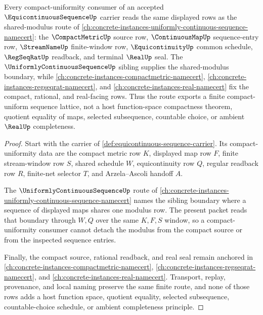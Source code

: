 \begin{theorem}
\label{thm:equicontinuous-sequence-uniform-lattice-route}
Every compact-uniformity consumer of an accepted $\EquicontinuousSequenceUp$ carrier reads the same displayed rows as the shared-modulus route of \autoref{ch:concrete-instances-uniformly-continuous-sequence-namecert}: the $\CompactMetricUp$ source row, $\ContinuousMapUp$ sequence-entry row, $\StreamNameUp$ finite-window row, $\EquicontinuityUp$ common schedule, $\RegSeqRatUp$ readback, and terminal $\RealUp$ seal. The $\UniformlyContinuousSequenceUp$ sibling supplies the shared-modulus boundary, while \autoref{ch:concrete-instances-compactmetric-namecert}, \autoref{ch:concrete-instances-regseqrat-namecert}, and \autoref{ch:concrete-instances-real-namecert} fix the compact, rational, and real-facing rows. Thus the route exports a finite compact-uniform sequence lattice, not a host function-space compactness theorem, quotient equality of maps, selected subsequence, countable choice, or ambient $\RealUp$ completeness.
\end{theorem}
\begin{proof}
Start with the carrier of \autoref{def:equicontinuous-sequence-carrier}. Its compact-uniformity data are the compact metric row $K$, displayed map row $F$, finite stream-window row $S$, shared schedule $W$, equicontinuity row $Q$, regular readback row $R$, finite-net selector $T$, and Arzela--Ascoli handoff $A$.

The $\UniformlyContinuousSequenceUp$ route of \autoref{ch:concrete-instances-uniformly-continuous-sequence-namecert} names the sibling boundary where a sequence of displayed maps shares one modulus row. The present packet reads that boundary through $W,Q$ over the same $K,F,S$ window, so a compact-uniformity consumer cannot detach the modulus from the compact source or from the inspected sequence entries.

Finally, the compact source, rational readback, and real seal remain anchored in \autoref{ch:concrete-instances-compactmetric-namecert}, \autoref{ch:concrete-instances-regseqrat-namecert}, and \autoref{ch:concrete-instances-real-namecert}. Transport, replay, provenance, and local naming preserve the same finite route, and none of those rows adds a host function space, quotient equality, selected subsequence, countable-choice schedule, or ambient completeness principle.
\end{proof}
